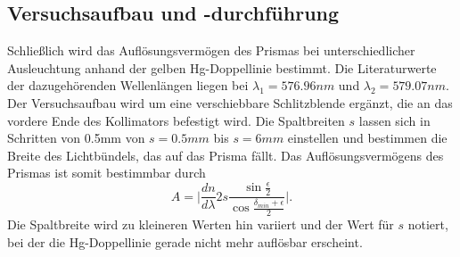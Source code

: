 \documentclass[12pt,a4paper]{article}
\begin{document}
\subsection{Versuchsaufbau und -durchführung}
Schließlich wird das Auflösungsvermögen des Prismas bei unterschiedlicher Ausleuchtung anhand der gelben Hg-Doppellinie bestimmt. Die Literaturwerte der dazugehörenden Wellenlängen liegen bei $\lambda_1=576.96nm$ und $\lambda_2=579.07nm$. Der Versuchsaufbau wird um eine verschiebbare Schlitzblende ergänzt, die an das vordere Ende des Kollimators befestigt wird. Die Spaltbreiten $s$ lassen sich in Schritten von 0.5mm von $s=0.5mm$ bis $s=6mm$ einstellen und bestimmen die Breite des Lichtbündels, das auf das Prisma fällt. Das Auflösungsvermögens des Prismas ist somit bestimmbar durch
\begin{equation}\label{Aufloesungsvermoegen_Prisma}
A=\Big|\frac{dn}{d\lambda}2s\frac{\sin{\frac{\epsilon}{2}}}{\cos{\frac{\delta_{min}+\epsilon}{2}}}\Big|.
\end{equation}
Die Spaltbreite wird zu kleineren Werten hin variiert und der Wert für $s$ notiert, bei der die Hg-Doppellinie gerade nicht mehr auflösbar erscheint.
\end{document}
